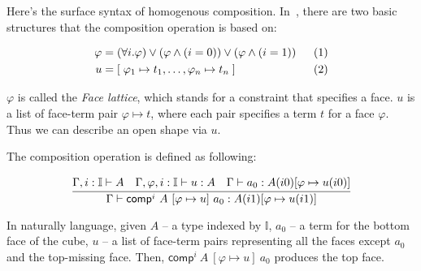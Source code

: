 Here's the surface syntax of homogenous composition.
In~\cite{CCHM}, there are two basic structures that the composition operation
is based on:

\begin{align*}
  \varphi &= (\forall i. \varphi)
            \vee (\varphi \wedge (i=0)) \vee (\varphi \wedge  (i=1))
  & \xtag \\
  u &= [ \; \varphi_1 \mapsto t_1,
      \dots, \varphi_n \mapsto t_n \; ]
  & \xtag
\end{align*}

$\varphi$ is called the \textit{Face lattice},
which stands for a constraint that specifies a face.
$u$ is a list of face-term pair $\varphi \mapsto t$,
where each pair specifies a term $t$ for a face $\varphi$.
Thus we can describe an open shape via $u$.

The composition operation is defined as following:

\newcommand{\comp}{\textsf{comp}}

\[
  \cfrac
  {\Gamma, i : \mathbb I \vdash A \quad
    \Gamma, \varphi, i : \mathbb I \vdash u : A \quad
    \Gamma \vdash a_0 : A(i0)[ \varphi \mapsto u(i0) ]}
  {\Gamma \vdash \comp^i~A~[ \varphi \mapsto u ]~a_0 :
    A(i1)[ \varphi \mapsto u(i1) ]}
\]

In naturally language, given
$A$ -- a type indexed by $\mathbb I$,
$a_0$ -- a term for the bottom face of the cube,
$u$ -- a list of face-term pairs representing all the faces except
$a_0$ and the top-missing face.
Then, $\comp^i~A~[ \varphi \mapsto u ]~a_0$ produces the top face.

